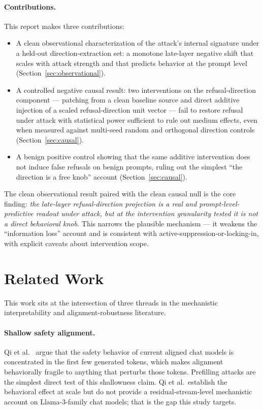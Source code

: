 \documentclass{article}
\begin{document}
\paragraph{Contributions.}
This report makes three contributions:

\begin{itemize}
\item A clean observational characterization of the attack's internal
  signature under a held-out direction-extraction set: a monotone
  late-layer negative shift that scales with attack strength and that
  predicts behavior at the prompt level (Section~\ref{sec:observational}).
\item A controlled negative causal result: two interventions on the
  refusal-direction component --- patching from a clean baseline source
  and direct additive injection of a scaled refusal-direction unit
  vector --- fail to restore refusal under attack with statistical power
  sufficient to rule out medium effects, even when measured against
  multi-seed random and orthogonal direction controls
  (Section~\ref{sec:causal}).
\item A benign positive control showing that the same additive
  intervention does not induce false refusals on benign prompts, ruling
  out the simplest ``the direction is a free knob'' account
  (Section~\ref{sec:causal}).
\end{itemize}

The clean observational result paired with the clean causal null is the
core finding: \emph{the late-layer refusal-direction projection is a real
and prompt-level-predictive readout under attack, but at the intervention
granularity tested it is not a direct behavioral knob.} This narrows the
plausible mechanism --- it weakens the ``information loss'' account and
is consistent with active-suppression-or-locking-in, with explicit
caveats about intervention scope.

\section{Related Work}
\label{sec:related}

This work sits at the intersection of three threads in the mechanistic
interpretability and alignment-robustness literature.

\paragraph{Shallow safety alignment.}
Qi et al.~\cite{qi2025shallow} argue that the safety behavior of current
aligned chat models is concentrated in the first few generated tokens,
which makes alignment behaviorally fragile to anything that perturbs
those tokens. Prefilling attacks are the simplest direct test of this
shallowness claim. Qi et al.\ establish the behavioral effect at scale
but do not provide a residual-stream-level mechanistic account on
Llama-3-family chat models; that is the gap this study targets.
\end{document}
